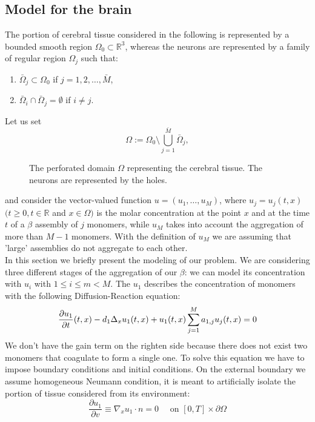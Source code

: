 \subsection{Model for the brain}
The portion of cerebral tissue considered  in the following is represented by a bounded smooth region $\Omega_{0}\subset \mathbb{R}^3$, whereas the neurons are represented by a family of regular region $\Omega_{j}$ such that:
\begin{enumerate}[label=(\roman*)]
    \item $\bar\Omega_{j}\subset \Omega_{0}$  if   $j=1,2,\dots,\bar{M}$,
    \item $\bar\Omega_{i}\cap \bar\Omega_{j}= \emptyset$  if $i\neq j$.
\end{enumerate}
Let us set 
$$
\Omega := \Omega_{0} \setminus
\bigcup_{j=1}^{\bar M} \bar\Omega_{j},
$$
\begin{figure}[H]
    \centering
    \caption{The perforated domain $\Omega$ representing the cerebral tissue. The neurons are represented by the holes.}
    \label{fig:perforated_domain}
  \end{figure}
and consider the vector-valued function $u=(u_1,\dots, u_M)$, where $u_j=u_j(t,x)$ $(t\geq 0, t\in \mathbb{R}$ and $x\in \Omega)$ is the molar concentration at the point $x$ and at the time $t$ of a \(\beta\) assembly of $j$ monomers, while $u_M$ takes into account the aggregation of more than $M-1$ monomers. With the definition of $u_M$ we are assuming that 'large' assemblies do not aggregate to each other.\\
In this section we briefly present the modeling of our problem. We are considering three different stages of the aggregation of our \(\beta\): we can model its concentration with $u_{i}$ with $1\leq i \leq m < M$.
The $u_{1}$ describes the concentration of monomers with the following Diffusion-Reaction equation: 
$$
\frac{\partial u_{1}}{\partial t}(t, x)-d_{1} \Delta_{x} u_{1}(t, x)+u_{1}(t, x) \sum_{j=1}^{M} a_{1, j} u_{j}(t, x)=0\\
$$
We don't have the gain term on the righten side because there does not exist two monomers that coagulate to form a single one.
To solve this equation we have to impose boundary conditions and initial conditions.
On the external boundary we assume homogeneous Neumann condition, it is meant to artificially isolate the portion of tissue considered from its environment:
$$
\frac{\partial u_1}{\partial v} \equiv \nabla_{x} u_1\cdot n=0 \quad \text { on }[0, T] \times \partial \Omega$$
